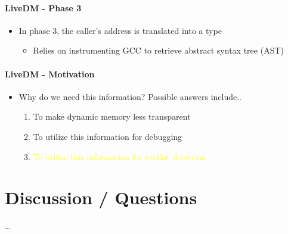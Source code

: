 \documentclass{i20lecture}
\begin{document}
\begin{frame}{\insertsection}
  \framesubtitle{LiveDM - Phase 3}
  
  \begin{itemize}
    \item In phase 3, the caller's address is translated into a type
\pause
    \begin{itemize}
     \item Relies on instrumenting GCC to retrieve abstract syntax tree (AST)
    \end{itemize}
  \end{itemize}
\end{frame}

\begin{frame}{\insertsection}
  \framesubtitle{LiveDM - Motivation}
  
  \begin{itemize}
    \item Why do we need this information? Possible answers include..
    \begin{enumerate}
\pause
     \item To make dynamic memory less transparent
\pause
     \item To utilize this information for debugging
\pause
     \item \textcolor{yellow}{To utilize this information for rootkit detection}
    \end{enumerate}
  \end{itemize}
\end{frame}



\section{Discussion / Questions}
\begin{frame}{\insertsection}
  \begin{center}
    \LARGE \dots
  \end{center}
\end{frame}
\end{document}
